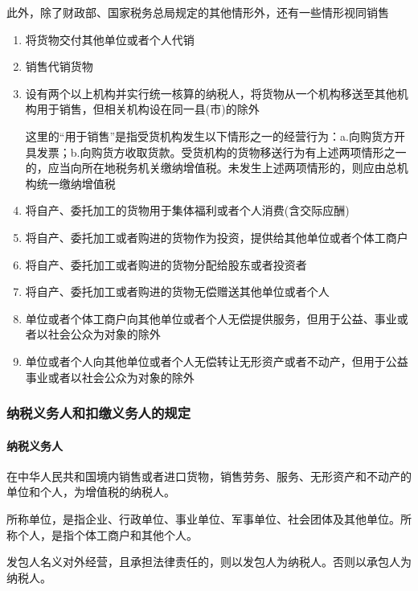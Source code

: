\documentclass[UTF8,12pt]{ctexart}
\numberwithin{equation}{section} %
\numberwithin{figure}{section}
\numberwithin{table}{section}
\begin{document}
	此外，除了财政部、国家税务总局规定的其他情形外，还有一些情形视同销售
	\begin{enumerate}
		\item 将货物交付其他单位或者个人代销
		
		\item 销售代销货物
		
		\item 设有两个以上机构并实行统一核算的纳税人，将货物从一个机构移送至其他机构用于销售，但相关机构设在同一县(市)的除外
		
		这里的“用于销售”是指受货机构发生以下情形之一的经营行为：a.向购货方开具发票；b.向购货方收取货款。受货机构的货物移送行为有上述两项情形之一的，应当向所在地税务机关缴纳增值税。未发生上述两项情形的，则应由总机构统一缴纳增值税
		
		\item 将自产、委托加工的货物用于集体福利或者个人消费(含交际应酬)
		
		\item 将自产、委托加工或者购进的货物作为投资，提供给其他单位或者个体工商户
		
		\item 将自产、委托加工或者购进的货物分配给股东或者投资者
		
		\item 将自产、委托加工或者购进的货物无偿赠送其他单位或者个人
		
		\item 单位或者个体工商户向其他单位或者个人无偿提供服务，但用于公益、事业或者以社会公众为对象的除外
		
		\item 单位或者个人向其他单位或者个人无偿转让无形资产或者不动产，但用于公益事业或者以社会公众为对象的除外
	\end{enumerate}
	
	
	
	\subsubsection{纳税义务人和扣缴义务人的规定}
	\paragraph{纳税义务人}在中华人民共和国境内销售或者进口货物，销售劳务、服务、无形资产和不动产的单位和个人，为增值税的纳税人。
	
	所称单位，是指企业、行政单位、事业单位、军事单位、社会团体及其他单位。所称个人，是指个体工商户和其他个人。
	
	发包人名义对外经营，且承担法律责任的，则以发包人为纳税人。否则以承包人为纳税人。
	
\end{document}
